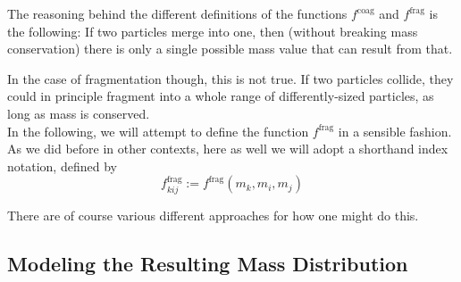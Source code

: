     The reasoning behind the different definitions of the functions $f^\text{coag}$ and
    $f^\text{frag}$ is the following: If two particles merge into one, then (without breaking mass
    conservation) there is only a single possible mass value that can result from that. 
    
    In the case of fragmentation though, this is not true. 
    If two particles collide, they could in principle fragment into a whole range of 
    differently-sized particles, as long as mass is conserved. \\


    In the following, we will attempt to define the function $f^\text{frag}$ in a sensible fashion.
    As we did before in other contexts, here as well we will adopt a shorthand index notation,
    defined by 
    \begin{equation}
        f^\text{frag}_{kij} := f^\text{frag}(m_k, m_i, m_j)
    \end{equation}

    There are of course various different approaches for how one might do this.



    \subsection{Modeling the Resulting Mass Distribution}
    \label{sec:modeling_the_mass_distribution_resulting_from_fragmentation}

